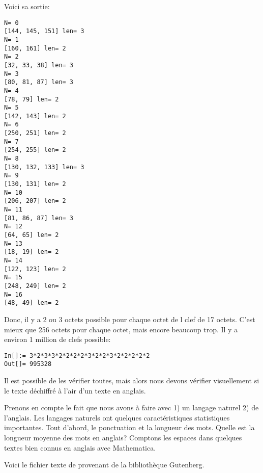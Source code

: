 Voici sa sortie:

\begin{lstlisting}
N= 0
[144, 145, 151] len= 3
N= 1
[160, 161] len= 2
N= 2
[32, 33, 38] len= 3
N= 3
[80, 81, 87] len= 3
N= 4
[78, 79] len= 2
N= 5
[142, 143] len= 2
N= 6
[250, 251] len= 2
N= 7
[254, 255] len= 2
N= 8
[130, 132, 133] len= 3
N= 9
[130, 131] len= 2
N= 10
[206, 207] len= 2
N= 11
[81, 86, 87] len= 3
N= 12
[64, 65] len= 2
N= 13
[18, 19] len= 2
N= 14
[122, 123] len= 2
N= 15
[248, 249] len= 2
N= 16
[48, 49] len= 2
\end{lstlisting}

Donc, il y a 2 ou 3 octets possible pour chaque octet de l clef de 17 octets.
C'est mieux que 256 octets pour chaque octet, mais encore beaucoup trop.
Il y a environ 1 million de clefs possible:

\begin{lstlisting}[caption=Mathematica,style=custommath]
In[]:= 3*2*3*3*2*2*2*2*3*2*2*3*2*2*2*2*2
Out[]= 995328
\end{lstlisting}

Il est possible de les vérifier toutes, mais alors nous devons vérifier visuellement
si le texte déchiffré à l'air d'un texte en anglais.

Prenons en compte le fait que nous avons à faire avec 1) un langage naturel 2) de l'anglais.
Les langages naturels ont quelques caractéristiques statistiques importantes.
Tout d'abord, le ponctuation et la longueur des mots.
Quelle est la longueur moyenne des mots en anglais?
Comptons les espaces dans quelques textes bien connus en anglais avec Mathematica.

Voici le fichier texte de \href{http://www.gutenberg.org/cache/epub/100/pg100.txt}{}
provenant de la bibliothèque Gutenberg.

